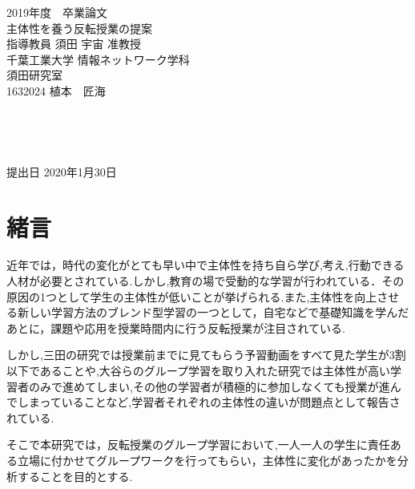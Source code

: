 \documentclass[a4j,11pt]{jsarticle}
\begin{document}
\setcounter{tocdepth}{3}
\thispagestyle{empty}
\clearpage
\addtocounter{page}{-1}
\begin{center}

\huge
2019年度　卒業論文\\[70pt]
\HUGE
主体性を養う反転授業の提案\\[70pt]
\huge
指導教員 須田 宇宙 准教授\\[50pt]
千葉工業大学 情報ネットワーク学科\\[20pt]
須田研究室\\[40pt]
1632024 \hspace{70pt} 植本　匠海\\[110pt]
\end{center}
\begin{flushright} 
\huge

\textcolor{white}{文字}

\textcolor{white}{文字}

提出日 2020年1月30日
\end{flushright}
\newpage
\pagestyle{empty}
\clearpage
\addtocounter{page}{-1}
\large
\tableofcontents
\thispagestyle{empty}
\clearpage
\pagestyle{plain}
\newpage

\listoftables
\listoffigures
\thispagestyle{empty}
\addtocounter{page}{-1}
\newpage

\addtocounter{page}{-1}
\section{緒言}

近年では，時代の変化がとても早い中で主体性を持ち自ら学び,考え,行動できる人材が必要とされている.しかし,教育の場で受動的な学習が行われている．その原因の1つとして学生の主体性が低いことが挙げられる.また,主体性を向上させる新しい学習方法のブレンド型学習の一つとして，自宅などで基礎知識を学んだあとに，課題や応用を授業時間内に行う反転授業が注目されている.

しかし,三田の研究では授業前までに見てもらう予習動画をすべて見た学生が3割以下であることや\cite{1},大谷らのグループ学習を取り入れた研究では主体性が高い学習者のみで進めてしまい,その他の学習者が積極的に参加しなくても授業が進んでしまっていることなど\cite{2},学習者それぞれの主体性の違いが問題点として報告されている.

そこで本研究では，反転授業のグループ学習において,一人一人の学生に責任ある立場に付かせてグループワークを行ってもらい，主体性に変化があったかを分析することを目的とする.
\newpage
\end{document}

